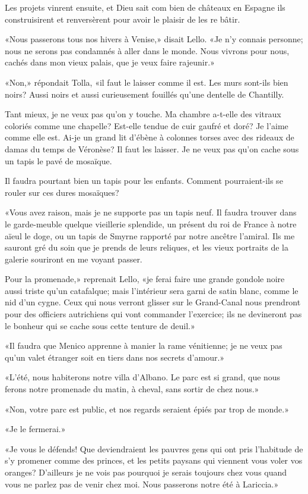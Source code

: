 Les projets vinrent ensuite, et Dieu sait com bien de châteaux en
Espagne ils construisirent et renversèrent pour avoir le plaisir de les
re bâtir.

«Nous passerons tous nos hivers à Venise,» disait Lello. «Je n'y connais
personne; nous ne serons pas condamnés à aller dans le monde. Nous
vivrons pour nous, cachés dans mon vieux palais, que je veux faire
rajeunir.»

«Non,» répondait Tolla, «il faut le laisser comme il est. Les murs
sont-ils bien noirs? Aussi noirs et aussi curieusement fouillés qu'une
dentelle de Chantilly.

Tant mieux, je ne veux pas qu'on y touche. Ma chambre a-t-elle des
vitraux coloriés comme une chapelle? Est-elle tendue de cuir gaufré et
doré? Je l'aime comme elle est. Ai-je un grand lit d'ébène à colonnes
torses avec des rideaux de damas du temps de Véronèse? Il faut les
laisser. Je ne veux pas qu'on cache sous un tapis le pavé de mosaïque.

Il faudra pourtant bien un tapis pour les enfants. Comment
pourraient-ils se rouler sur ces dures mosaïques?

«Vous avez raison, mais je ne supporte pas un tapis neuf. Il faudra
trouver dans le garde-meuble quelque vieillerie splendide, un présent du
roi de France à notre aïeul le doge, ou un tapis de Smyrne rapporté par
notre ancêtre l'amiral. Ils me sauront gré du soin que je prends de
leurs reliques, et les vieux portraits de la galerie souriront en me
voyant passer.

Pour la promenade,» reprenait Lello, «je ferai faire une grande gondole
noire aussi triste qu'un catafalque; mais l'intérieur sera garni de
satin blanc, comme le nid d'un cygne. Ceux qui nous verront glisser sur
le Grand-Canal nous prendront pour des officiers autrichiens qui vont
commander l'exercice; ils ne devineront pas le bonheur qui se cache sous
cette tenture de deuil.»

«Il faudra que Menico apprenne à manier la rame vénitienne; je ne veux
pas qu'un valet étranger soit en tiers dans nos secrets d'amour.»

«L'été, nous habiterons notre villa d'Albano. Le parc est si grand, que
nous ferons notre promenade du matin, à cheval, sans sortir de chez
nous.»

«Non, votre parc est public, et nos regards seraient épiés par trop de
monde.»

«Je le fermerai.»

«Je vous le défends! Que deviendraient les pauvres gens qui ont pris
l'habitude de s'y promener comme des princes, et les petits paysans qui
viennent vous voler vos oranges? D'ailleurs je ne vois pas pourquoi je
serais toujours chez vous quand vous ne parlez pas de venir chez moi.
Nous passerons notre été à Lariccia.»

